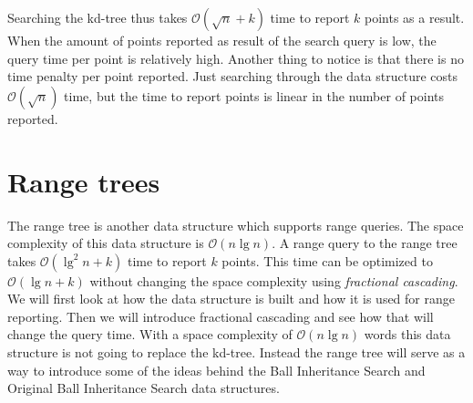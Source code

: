 
Searching the kd-tree thus takes $\mathcal{O}(\sqrt{n} + k)$ time to report $k$ points as a result. When the amount of points reported as result of the search query is low, the query time per point is relatively high. Another thing to notice is that there is no time penalty per point reported. Just searching through the data structure costs $\mathcal{O}(\sqrt{n})$ time, but the time to report points is linear in the number of points reported.



\section{Range trees}
\label{sect:rangetrees}

The range tree is another data structure which supports range queries. The space complexity of this data structure is $\mathcal{O}(n\lg n)$. A range query to the range tree takes $\mathcal{O}(\lg^2 n + k)$ time to report $k$ points. This time can be optimized to $\mathcal{O}(\lg n + k)$ without changing the space complexity using \emph{fractional cascading}. We will first look at how the data structure is built and how it is used for range reporting. Then we will introduce fractional cascading and see how that will change the query time. With a space complexity of $\mathcal{O}(n \lg n)$ words this data structure is not going to replace the kd-tree. Instead the range tree will serve as a way to introduce some of the ideas behind the Ball Inheritance Search and Original Ball Inheritance Search data structures. \\


